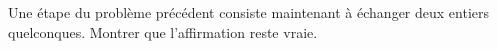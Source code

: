 Une étape du problème précédent consiste maintenant à échanger deux entiers quelconques. Montrer que l'affirmation reste vraie.
